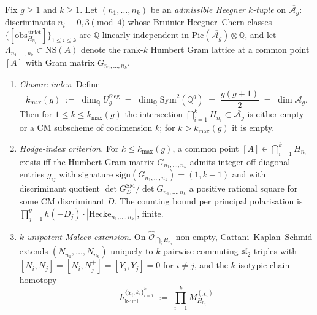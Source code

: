 \begin{theorem}
\label{thm:universal-k-tower-malcev-closure}
\ClaimStatusConditional
{}%
%
%
%
%
\providecommand{\kmax}{k_{\max}}%
Fix $g\ge 1$ and $k\ge 1$. Let $(n_1,\ldots,n_k)$ be an
\emph{admissible Heegner $k$-tuple} on $\overline{\mathcal A_g}$:
discriminants $n_i\equiv 0,3\pmod 4$ whose Bruinier
Heegner--Chern classes
$\{[\mathrm{obs}^{\mathrm{strict}}_{H_{n_i}}]\}_{1\le i\le k}$ are
$\mathbb Q$-linearly independent in
$\mathrm{Pic}(\overline{\mathcal A_g})\otimes\mathbb Q$, and let
$\Lambda_{n_1,\ldots,n_k}\subset\mathrm{NS}(A)$ denote the rank-$k$
Humbert Gram lattice at a common point $[A]$ with Gram matrix
$G_{n_1,\ldots,n_k}$.
\begin{enumerate}[label=\textup{(\alph*)}]
\item \emph{Closure index.} Define
\[
\kmax(g)\;:=\;\dim_{\mathbb Q}U^{\mathrm{Sieg}}_g
\;=\;\dim_{\mathbb Q}\mathrm{Sym}^2(\mathbb Q^g)
\;=\;\frac{g(g+1)}{2}
\;=\;\dim\overline{\mathcal A_g}.
\]
Then for $1\le k\le\kmax(g)$ the intersection
$\bigcap_{i=1}^k H_{n_i}\subset\overline{\mathcal A_g}$ is either
empty or a CM subscheme of codimension $k$; for
$k>\kmax(g)$ it is empty.
\item \emph{Hodge-index criterion.} For $k\le\kmax(g)$, a common
point $[A]\in\bigcap_{i=1}^k H_{n_i}$ exists iff the Humbert Gram
matrix $G_{n_1,\ldots,n_k}$ admits integer off-diagonal entries
$g_{ij}$ with signature $\mathrm{sign}(G_{n_1,\ldots,n_k})=(1,k-1)$
and with discriminant quotient
$\det G^{\mathrm{SM}}_D/\det G_{n_1,\ldots,n_k}$ a positive rational
square for some CM discriminant $D$. The counting bound per
principal polarisation is
$\prod_{j=1}^{g}h(-D_j)\cdot|\mathrm{Hecke}_{n_1,\ldots,n_k}|$,
finite.
\item \emph{$k$-unipotent Malcev extension.} On
$\widehat{\mathcal O}_{\bigcap_i H_{n_i}}$ non-empty, Cattani--Kaplan--Schmid
\cite[Thm.~3.3, \S 3.7]{CattaniKaplanSchmid1986} extends
$(N_{n_1},\ldots,N_{n_k})$ uniquely to $k$ pairwise commuting
$\mathfrak{sl}_2$-triples with $[N_i,N_j]=[N_i,N_j^+]=[Y_i,Y_j]=0$
for $i\neq j$, and the $k$-isotypic chain homotopy
\begin{equation}
\label{eq:k-unipotent-chain-homotopy}
h^{\{\chi_i,k_i\}_{i=1}^k}_{\mathrm{k\text{-}uni}}
\;:=\;
\prod_{i=1}^{k}M^{(\chi_i)}_{H_{n_i}}

\end{equation}
\end{enumerate}
\end{theorem}
